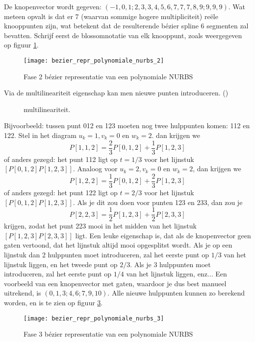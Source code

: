\documentclass{report}
\begin{document}
\begin{itemize}
{\begin{itemize}
			De knopenvector wordt gegeven: $(-1, 0, 1 ; 2, 3, 3, 4, 5, 6, 7, 7, 7, 8, 9 ; 9, 9, 9)$. Wat meteen opvalt is dat er 7 (waarvan sommige hogere multipliciteit) reële knooppunten zijn, wat betekent dat de resulterende bézier spline 6 segmenten zal bevatten. Schrijf eerst de blossomnotatie van elk knooppunt, zoals weergegeven op figuur \ref {fig:bezier_repr_polynomiale_nurbs_2}.
			\begin{figure}[ht]
				\centering
				\texttt{[image: bezier\_repr\_polynomiale\_nurbs\_2]}	
				\caption{Fase 2 bézier representatie van een polynomiale NURBS}
				\label{fig:bezier_repr_polynomiale_nurbs_2}
			\end{figure}

			Via de multilineariteit eigenschap kan men nieuwe punten introduceren. ()
			\begin{figure}[ht]
				\centering
				\caption{multilineariteit.}
				\label{fig:multilineariteit}
			\end{figure}	

			Bijvoorbeeld: tussen punt 012 en 123 moeten nog twee hulppunten komen: 112 en 122. Stel in het diagram $u_k = 1, v_k = 0$ en $w_k = 2$. dan krijgen we
			$$P[1,1,2] = \frac{2}{3}P[0,1,2] + \frac{1}{3}P[1,2,3]$$
			of anders gezegd: het punt 112 ligt op $t = 1/3$ voor het lijnstuk $[P[0,1,2]P[1,2,3]]$.
			Analoog voor $u_k = 2, v_k = 0$ en $w_k = 2$, dan krijgen we
			$$P[1,2,2] = \frac{1}{3}P[0,1,2] + \frac{2}{3}P[1,2,3]$$
			of anders gezegd: het punt 122 ligt op $t = 2/3$ voor het lijnstuk  $[P[0,1,2]P[1,2,3]]$.
			Als je dit zou doen voor punten 123 en 233, dan zou je 
			$$P[2, 2, 3] = \frac{1}{2}P[1,2,3] + \frac{1}{2}P[2,3,3]$$
			krijgen, zodat het punt 223 mooi in het midden van het lijnstuk $[P[1,2,3]P[2,3,3]]$ ligt. Een leuke eigenschap is, dat als de knopenvector geen gaten vertoond, dat het lijnstuk altijd mooi opgesplitst wordt. Als je op een lijnstuk dan 2 hulppunten moet introduceren, zal het eerste punt op $1/3$ van het lijnstuk liggen, en het tweede punt op $2/3$. Als je 3 hulppunten moet introduceren, zal het eerste punt op $1/4$ van het lijnstuk liggen, enz... Een voorbeeld van een knopenvector met gaten, waardoor je dus best manueel uitrekend, is $(0, 1, 3 ; 4, 6 ; 7, 9, 10)$. Alle nieuwe hulppunten kunnen zo berekend worden, en is te zien op figuur \ref{fig:bezier_repr_polynomiale_nurbs_3}.
			\begin{figure}[ht]
				\centering
				\texttt{[image: bezier\_repr\_polynomiale\_nurbs\_3]}	
				\caption{Fase 3 bézier representatie van een polynomiale NURBS}
				\label{fig:bezier_repr_polynomiale_nurbs_3}
			\end{figure}


\end{itemize}}
\end{itemize}
\end{document}

